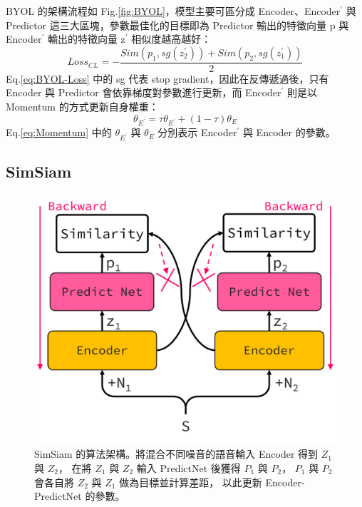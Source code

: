 \documentclass[10pt,twocolumn,letterpaper]{article}
\begin{document}
\begin{CJK}{UTF8}{bkai}
   BYOL 的架構流程如 Fig.\ref{fig:BYOL}，模型主要可區分成 Encoder、Encoder$^{'}$ 與 Predictor
   這三大區塊，參數最佳化的目標即為 Predictor 輸出的特徵向量 p 與 Encoder$^{'}$ 輸出的特徵向量 z$^{'}$
   相似度越高越好：
   \begin{equation}
      Loss_{CL} = -\frac{Sim(p_1, sg(z^{'}_2))+Sim(p_2, sg(z^{'}_1))}{2}
      \label{eq:BYOL-Loss}
   \end{equation}
   Eq.\ref{eq:BYOL-Loss} 中的 sg 代表 stop gradient，因此在反傳遞過後，只有 Encoder 與 Predictor 會依靠梯度對參數進行更新，而 Encoder$^{'}$ 則是以 Momentum 的方式更新自身權重：
   \begin{equation}
      \theta_{E^{'}}=\tau\theta_{E^{'}}+(1-\tau)\theta_{E}
      \label{eq:Momentum}
   \end{equation}
   Eq.\ref{eq:Momentum} 中的 $\theta_{E^{'}}$ 與 $\theta_{E}$ 分別表示 Encoder$^{'}$ 與 Encoder 的參數。

   \subsection{SimSiam}
   \begin{figure}
      \begin{center}
         \includegraphics[width=1\linewidth]{img/SimSiam.png}
      \end{center}
      \caption{SimSiam 的算法架構。將混合不同噪音的語音輸入 Encoder 得到 $Z_1$ 與 $Z_2$，
         在將 $Z_1$ 與 $Z_2$ 輸入 PredictNet 後獲得 $P_1$ 與 $P_2$，
         $P_1$ 與 $P_2$ 會各自將 $Z_2$ 與 $Z_1$ 做為目標並計算差距，
         以此更新 Encoder-PredictNet 的參數。\label{fig:SimSiam}}
   \end{figure}


\end{CJK}
\end{document}
